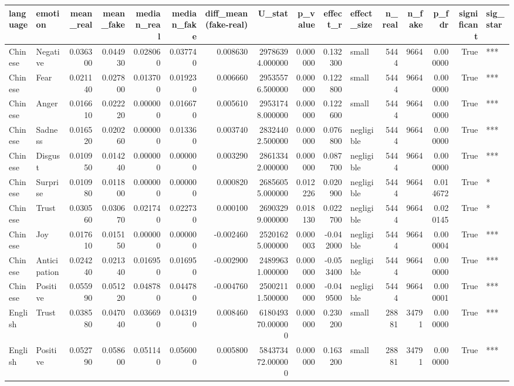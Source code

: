 \begin{tabular}{llrrrrrrrrlrrrrl}
\toprule
language & emotion & mean_real & mean_fake & median_real & median_fake & diff_mean (fake-real) & U_stat & p_value & effect_r & effect_size & n_real & n_fake & p_fdr & significant & sig_star \\
\midrule
Chinese & Negative & 0.036300 & 0.044930 & 0.028060 & 0.037740 & 0.008630 & 29786394.000000 & 0.000000 & 0.132300 & small & 5444 & 9664 & 0.000000 & True & *** \\
Chinese & Fear & 0.021140 & 0.027800 & 0.013700 & 0.019230 & 0.006660 & 29535576.500000 & 0.000000 & 0.122800 & small & 5444 & 9664 & 0.000000 & True & *** \\
Chinese & Anger & 0.016610 & 0.022220 & 0.000000 & 0.016670 & 0.005610 & 29531748.000000 & 0.000000 & 0.122600 & small & 5444 & 9664 & 0.000000 & True & *** \\
Chinese & Sadness & 0.016520 & 0.020260 & 0.000000 & 0.013360 & 0.003740 & 28324402.500000 & 0.000000 & 0.076800 & negligible & 5444 & 9664 & 0.000000 & True & *** \\
Chinese & Disgust & 0.010950 & 0.014240 & 0.000000 & 0.000000 & 0.003290 & 28613342.000000 & 0.000000 & 0.087700 & negligible & 5444 & 9664 & 0.000000 & True & *** \\
Chinese & Surprise & 0.010980 & 0.011800 & 0.000000 & 0.000000 & 0.000820 & 26856055.000000 & 0.012226 & 0.020900 & negligible & 5444 & 9664 & 0.014672 & True & * \\
Chinese & Trust & 0.030560 & 0.030670 & 0.021740 & 0.022730 & 0.000100 & 26903299.000000 & 0.018130 & 0.022700 & negligible & 5444 & 9664 & 0.020145 & True & * \\
Chinese & Joy & 0.017610 & 0.015150 & 0.000000 & 0.000000 & -0.002460 & 25201625.000000 & 0.000003 & -0.042000 & negligible & 5444 & 9664 & 0.000004 & True & *** \\
Chinese & Anticipation & 0.024240 & 0.021340 & 0.016950 & 0.016950 & -0.002900 & 24899631.000000 & 0.000000 & -0.053400 & negligible & 5444 & 9664 & 0.000000 & True & *** \\
Chinese & Positive & 0.055990 & 0.051220 & 0.048780 & 0.044780 & -0.004760 & 25002111.500000 & 0.000000 & -0.049500 & negligible & 5444 & 9664 & 0.000001 & True & *** \\
English & Trust & 0.038580 & 0.047040 & 0.036690 & 0.043190 & 0.008460 & 618049370.000000 & 0.000000 & 0.230200 & small & 28881 & 34791 & 0.000000 & True & *** \\
English & Positive & 0.052790 & 0.058600 & 0.051140 & 0.056000 & 0.005800 & 584373472.000000 & 0.000000 & 0.163200 & small & 28881 & 34791 & 0.000000 & True & *** \\

\end{tabular}
